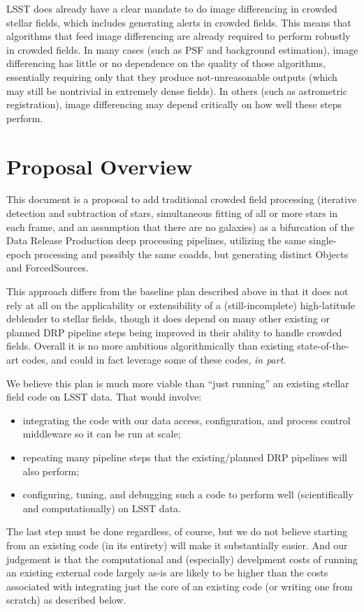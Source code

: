 \documentclass[DM,authoryear,toc]{lsstdoc}
\begin{document}
LSST does already have a clear mandate to do image differencing in crowded stellar fields, which includes generating alerts in crowded fields.
This means that algorithms that feed image differencing are already required to perform robustly in crowded fields.
In many cases (such as PSF and background estimation), image differencing has little or no dependence on the quality of those algorithms, essentially requiring only that they produce not-unreasonable outputs (which may still be nontrivial in extremely dense fields).
In others (such as astrometric registration), image differencing may depend critically on how well these steps perform.

\section{Proposal Overview}

This document is a proposal to add traditional crowded field processing (iterative detection and subtraction of stars, simultaneous fitting of all or more stars in each frame, and an assumption that there are no galaxies) as a bifurcation of the Data Release Production deep processing pipelines, utilizing the same single-epoch processing and possibly the same coadds, but generating distinct Objects and ForcedSources.

This approach differs from the baseline plan described above in that it does not rely at all on the applicability or extensibility of a (still-incomplete) high-latitude deblender to stellar fields, though it does depend on many other existing or planned DRP pipeline steps being improved in their ability to handle crowded fields.
Overall it is no more ambitious algorithmically than existing state-of-the-art codes, and could in fact leverage some of these codes, \emph{in part}.

We believe this plan is much more viable than ``just running'' an existing stellar field code on LSST data.
That would involve:
\begin{itemize}
  \item integrating the code with our data access, configuration, and process control middleware so it can be run at scale;
  \item repeating many pipeline steps that the existing/planned DRP pipelines will also perform;
  \item configuring, tuning, and debugging such a code to perform well (scientifically and computationally) on LSST data.
\end{itemize}
The last step must be done regardless, of course, but we do not believe starting from an existing code (in its entirety) will make it substantially easier.
And our judgement is that the computational and (especially) develpment costs of running an existing external code largely as-is are likely to be higher than the costs associated with integrating just the core of an existing code (or writing one from scratch) as described below.
\end{document}
